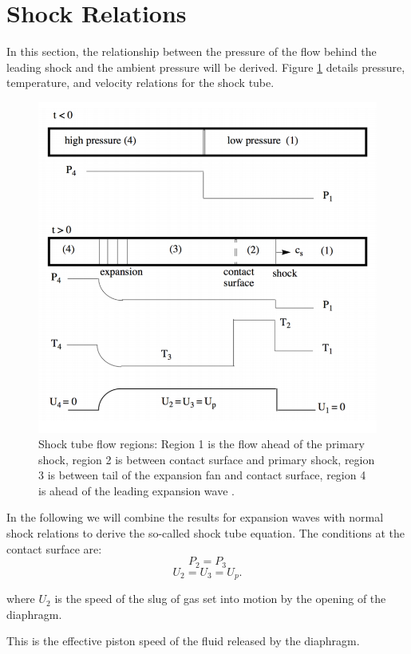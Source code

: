 \section{Shock Relations} \label{app:shock}
In this section, the relationship between the pressure of the flow behind the leading shock and the ambient pressure will be derived. Figure \ref{fig:shock} details pressure, temperature, and velocity relations for the shock tube.

\begin{figure}[H]
	\centering
	\includegraphics[scale=0.5]{figshock.png} 
	\caption{Shock tube flow regions: Region 1 is the flow ahead of the primary shock, region 2 is between contact surface and primary shock, region 3 is between tail of the expansion fan and contact surface, region 4 is ahead of the leading expansion wave \citep{cantwell2017}.}
	\label{fig:shock}
\end{figure}

In the following we will combine the results for expansion waves with normal shock relations to derive the so-called shock tube equation. The conditions at the contact surface are:
\begin{equation}
	P_2 = P_3 
\end{equation}
\begin{equation}
	U_2 = U_3 = U_p.
\end{equation}
\begin{center}
	where $U_2$ is the speed of the slug of gas set into motion by the opening of the diaphragm.
\end{center}
This is the effective piston speed of the fluid released by the diaphragm.


